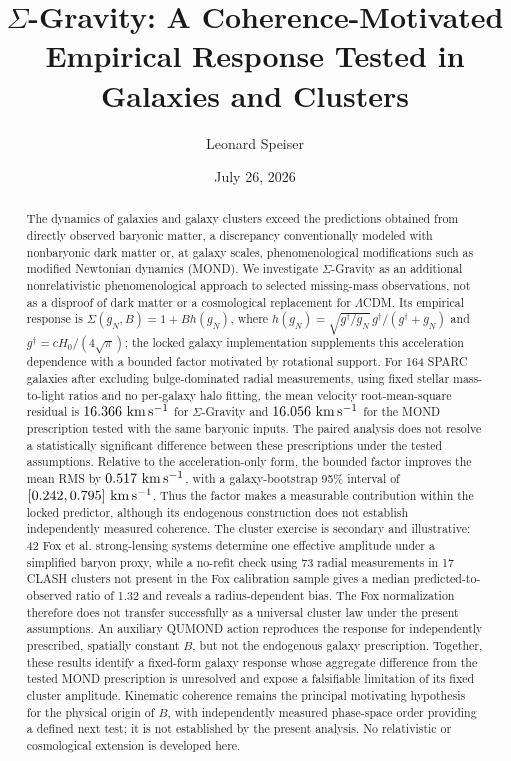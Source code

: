 \documentclass[aps,prd,reprint,superscriptaddress,showpacs,floatfix,longbibliography]{revtex4-2}
\begin{document}
\linenumbers

\title{$\Sigma$-Gravity: A Coherence-Motivated Empirical Response Tested in Galaxies and Clusters}

\author{Leonard Speiser}

\date{July 26, 2026}

\begin{abstract}
The dynamics of galaxies and galaxy clusters exceed the predictions obtained from directly observed baryonic matter, a discrepancy conventionally modeled with nonbaryonic dark matter or, at galaxy scales, phenomenological modifications such as modified Newtonian dynamics (MOND). We investigate $\Sigma$-Gravity as an additional nonrelativistic phenomenological approach to selected missing-mass observations, not as a disproof of dark matter or a cosmological replacement for $\Lambda$CDM. Its empirical response is $\Sigma(g_N,B)=1+B h(g_N)$, where $h(g_N)=\sqrt{g^\dagger/g_N}\,g^\dagger/(g^\dagger+g_N)$ and $g^\dagger=cH_0/(4\sqrt{\pi})$; the locked galaxy implementation supplements this acceleration dependence with a bounded factor motivated by rotational support. For 164 SPARC galaxies after excluding bulge-dominated radial measurements, using fixed stellar mass-to-light ratios and no per-galaxy halo fitting, the mean velocity root-mean-square residual is $16.366\ {\rm km\,s^{-1}}$ for $\Sigma$-Gravity and $16.056\ {\rm km\,s^{-1}}$ for the MOND prescription tested with the same baryonic inputs. The paired analysis does not resolve a statistically significant difference between these prescriptions under the tested assumptions. Relative to the acceleration-only form, the bounded factor improves the mean RMS by $0.517\ {\rm km\,s^{-1}}$, with a galaxy-bootstrap 95\% interval of $[0.242,0.795]\ {\rm km\,s^{-1}}$. Thus the factor makes a measurable contribution within the locked predictor, although its endogenous construction does not establish independently measured coherence. The cluster exercise is secondary and illustrative: 42 Fox et al. strong-lensing systems determine one effective amplitude under a simplified baryon proxy, while a no-refit check using 73 radial measurements in 17 CLASH clusters not present in the Fox calibration sample gives a median predicted-to-observed ratio of 1.32 and reveals a radius-dependent bias. The Fox normalization therefore does not transfer successfully as a universal cluster law under the present assumptions. An auxiliary QUMOND action reproduces the response for independently prescribed, spatially constant $B$, but not the endogenous galaxy prescription. Together, these results identify a fixed-form galaxy response whose aggregate difference from the tested MOND prescription is unresolved and expose a falsifiable limitation of its fixed cluster amplitude. Kinematic coherence remains the principal motivating hypothesis for the physical origin of $B$, with independently measured phase-space order providing a defined next test; it is not established by the present analysis. No relativistic or cosmological extension is developed here.
\end{abstract}
\end{document}
